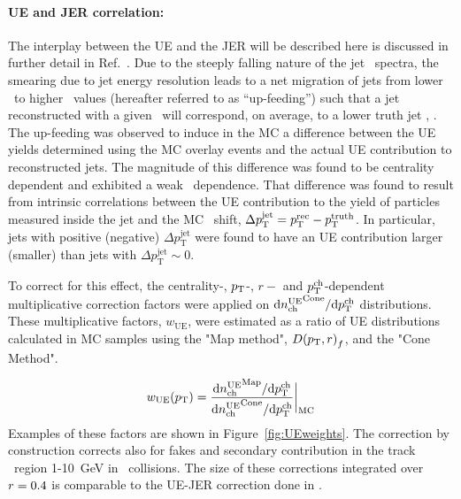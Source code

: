 \paragraph{UE and JER correlation:}
The interplay between the UE and the JER will be described here is discussed in further detail in Ref.~\cite{ATLAS-COM-PHYS-2012-1653}.
Due to the steeply falling nature of the jet \pt\ spectra, the smearing due to jet energy resolution leads to a net migration of jets from lower \pt\ to higher \pt\ values (hereafter referred to as ``up-feeding'') such that a jet reconstructed with a given \pTrec\ will correspond, on average, to a lower truth jet \pT, \avgpttrue.
The up-feeding was observed to induce in the MC a difference between the UE yields determined using the MC overlay events and the actual UE contribution to reconstructed jets.
The magnitude of this difference was found to be centrality dependent and exhibited a weak \pTjet\ dependence.
That difference was found to result from intrinsic correlations between the UE contribution to the yield of particles measured inside the jet and the MC \pTjet\ shift, $\Delta p_{\mathrm{T}}^{\mathrm{jet}}= \mbox{$p_{{\mathrm{T}}}^{\mathrm{rec}}$} - \mbox{$p_{\mathrm{T}}^{\mathrm{truth}}$}$.
In particular, jets with positive (negative) $\Delta p_{\mathrm{T}}^{\mathrm{jet}}$ were found to have an UE contribution larger (smaller) than jets with $\Delta p_{\mathrm{T}}^{\mathrm{jet}} \sim 0$.

To correct for this effect, the centrality-, $\mbox{$p_{{\mathrm{T}}}$}$-, $r-$ and $\mbox{$p_{{\mathrm{T}}}^{\mathrm{ch}}$}$-dependent multiplicative correction factors were applied on $\mathrm{d} \mbox{$n_{\mathrm{ch}}^{\mathrm{UE}}$}^{\mathrm{Cone}}/ \mathrm{d} \mbox{$p_{{\mathrm{T}}}^{\mathrm{ch}}$}$ distributions.
These multiplicative factors, $w_{\mathrm{UE}}$, were estimated as a ratio of UE distributions calculated in MC samples using the "Map method", $\mbox{$D( \mbox{$p_{\mathrm{T}}$}, r)$}_{f}$, and the "Cone Method".

\begin{eqnarray}
w_{\mathrm{UE}} (\mbox{$p_{\mathrm{T}}$}) = \frac{\mathrm{d} \mbox{$n_{\mathrm{ch}}^{\mathrm{UE}}$}^{\mathrm{Map}}/ \mathrm{d} \mbox{$p_{{\mathrm{T}}}^{\mathrm{ch}}$}}{\mathrm{d} \mbox{$n_{\mathrm{ch}}^{\mathrm{UE}}$}^{\mathrm{Cone}}/ \mathrm{d} \mbox{$p_{{\mathrm{T}}}^{\mathrm{ch}}$}}\bigg|_{\mathrm{MC}}
\end{eqnarray}   
Examples of these factors are shown in Figure~\ref{fig:UEweights}.
The correction by construction corrects also for fakes and secondary contribution in the track \pT\ region 1-10~GeV in \PbPb\ collisions.
The size of these corrections integrated over $\mbox{$r$} = 0.4$ is comparable to the UE-JER correction done in \cite{PhysRevC.98.024908}.

